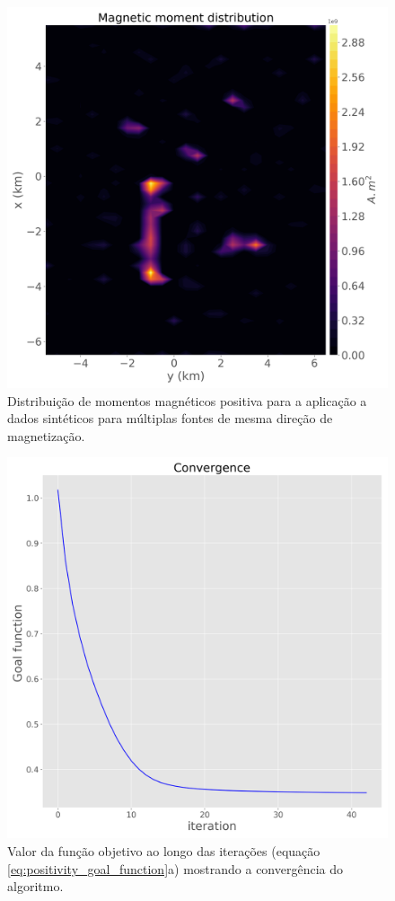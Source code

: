 \begin{figure}
	\centering
	\includegraphics[width=.9\textwidth]{Fig/eqlayer/unidir_test/magnetic_moment_positive_LM_NNLS_magRM.png}
	\caption{Distribuição de momentos magnéticos positiva para a aplicação a dados sintéticos para múltiplas fontes de mesma direção de magnetização.}
	\label{fig:dist_momentos_pos_1}
\end{figure}

\begin{figure}
	\centering
	\includegraphics[width=.9\textwidth]{Fig/eqlayer/unidir_test/convergence_LM_NNLS_magRM.png}
	\caption{Valor da função objetivo ao longo das iterações (equação \ref{eq:positivity_goal_function}a) mostrando a convergência do algoritmo.}
	\label{fig:convergence_1}
\end{figure}


